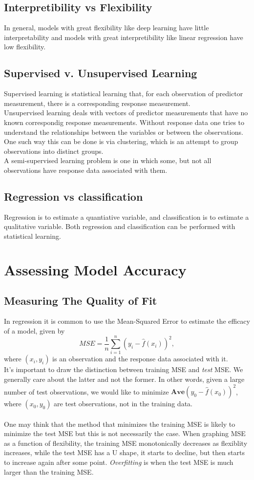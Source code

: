 \documentclass[11pt]{article} %
\begin{document}
	\subsection{Interpretibility vs Flexibility}
		In general, models with great flexibility like deep learning have little interpretability and models with great interpretibility like linear regression have low flexibility.
	\subsection{Supervised v. Unsupervised Learning}
		Supervised learning is statistical learning that,  for each observation of predictor measurement, there is a corresponding response measurement. \\
		Unsupervised learning deals with vectors of predictor measurements that have no known correspondig response measurements. Without response data one tries to understand the relationships between the variables or between the observations. One such way this can be done is via clustering, which is an attempt to group observations into distinct groups. \\
		A semi-supervised learning problem is one in which some, but not all observations have response data associated with them.
	\subsection{Regression vs classification}
		Regression is to estimate a quantiative variable, and classification is to estimate a qualitative variable. Both regression and classification can be performed with statistical learning.

\section{Assessing Model Accuracy}
	\subsection{Measuring The Quality of Fit}
		In regression it is common to use the Mean-Squared Error to estimate the efficacy of a model, given by
		$$MSE = \frac{1}{n}\sum_{i=1}^{n}(y_i - \hat{f}(x_i))^2 ,$$
		where $(x_i, y_i)$ is an observation and the response data associated with it. \\
		It's important to draw the distinction between training MSE and \emph{test} MSE. We generally care about the latter and not the former. In other words, given a large number of test observations, we would like to minimize $\mathbf{Ave}(y_0 -\hat{f}(x_0))^2$, where $(x_0, y_0)$ are test observations, not in the training data. \\ \\ 
		One may think that the method that minimizes the training MSE is likely to minimize the test MSE but this is not necessarily the case. When graphing MSE as a function of flexibility, the training MSE monotonically decreases as flexiblity increases, while the test MSE has a U shape, it starts to decline, but then starts to increase again after some point. \emph{Overfitting} is when the test MSE is much larger than the training MSE.
\end{document}
